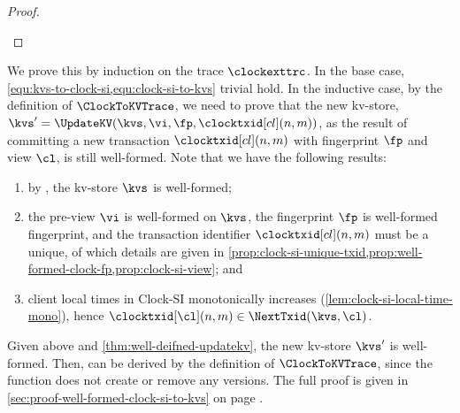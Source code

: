 \begin{proof}
\begin{enumerate}
\begin{enumerate}
    \end{enumerate}
\end{enumerate}
\end{proof}
\begin{proofsketch}
We prove this by induction on the trace \( \clockexttrc\).
In the base case, \cref{equ:kvs-to-clock-si,equ:clock-si-to-kvs} trivial hold.
In the inductive case, by the definition of \( \ClockToKVTrace\),
we need to prove that the new kv-store, \(  \kvs' = \UpdateKV(\kvs,\vi,\fp,\clocktxid[cl](n,m)) \), 
as the result of committing a new transaction \( \clocktxid[cl](n,m) \) with fingerprint \( \fp \) and view \( \cl \),
is still well-formed.
Note that we have the following results:
\begin{enumerate}
    \item by \ih, the kv-store \( \kvs \) is well-formed;
    \item the pre-view \( \vi \) is well-formed on \( \kvs \),
    the fingerprint \( \fp \) is well-formed fingerprint,
    and the transaction identifier \( \clocktxid[cl](n,m) \) must be a unique,
    of which details are given in \cref{prop:clock-si-unique-txid,prop:well-formed-clock-fp,prop:clock-si-view}; and 
    \item client local times in Clock-SI monotonically increases (\cref{lem:clock-si-local-time-mono}), hence \( \clocktxid[\cl](n,m) \in \NextTxid(\kvs,\cl) \).
\end{enumerate}
Given above and \cref{thm:well-deifned-updatekv},
the new kv-store \( \kvs' \) is well-formed.
Then,  can be derived by the definition of \( \ClockToKVTrace \),
since the function does not create or remove any versions.
The full proof is given in \cref{sec:proof-well-formed-clock-si-to-kvs}
on page \pageref{sec:proof-well-formed-clock-si-to-kvs}.
\end{proofsketch}

